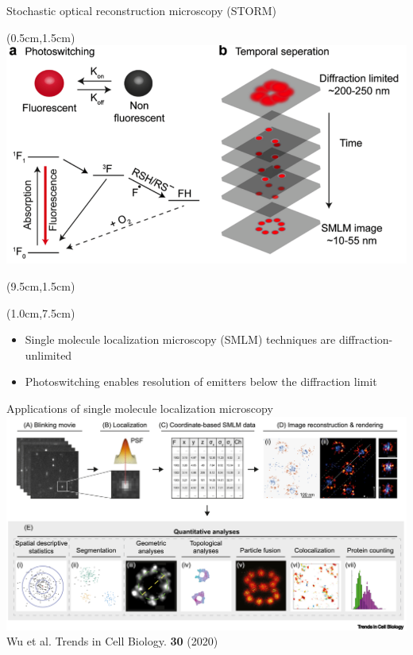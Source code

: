 \documentclass{beamer}					%
\begin{document}
\begin{frame}{Stochastic optical reconstruction microscopy (STORM)}
\begin{textblock*}{9cm}(0.5cm,1.5cm)
\includegraphics[width=\textwidth]{media/Intro.png}
\end{textblock*}
\begin{textblock*}{5cm}(9.5cm,1.5cm)
\end{textblock*}
\begin{textblock*}{\textwidth}(1.0cm,7.5cm)
\begin{itemize}
\item Single molecule localization microscopy (SMLM) techniques are diffraction-unlimited
\item Photoswitching enables resolution of emitters below the diffraction limit
\end{itemize}
\end{textblock*}
\end{frame}


\begin{frame}{Applications of single molecule localization microscopy}
\includegraphics[width=\textwidth]{media/Apps.png}
Wu et al. Trends in Cell Biology. \textbf{30} (2020)
\end{frame}
\end{document}
